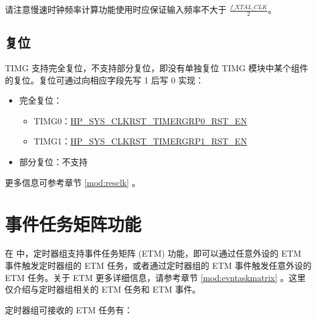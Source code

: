 \documentclass[main\_\_CN.tex]{subfiles}
\begin{document}
请注意慢速时钟频率计算功能使用时应保证输入频率不大于 $\frac{f\_XTAL\_CLK}{2}$。


\subsection{复位}


TIMG 支持完全复位，不支持部分复位，即没有单独复位 TIMG 模块中某个组件的复位。复位可通过向相应字段先写 1 后写 0 实现：

\begin{itemize}
    \item 完全复位：
        \begin{itemize}
            \item TIMG0：\hyperref[fielddesc:HPSYSCLKRSTTIMERGRP0RSTEN]{HP\_SYS\_CLKRST\_TIMERGRP0\_RST\_EN}
            \item TIMG1：\hyperref[fielddesc:HPSYSCLKRSTTIMERGRP1RSTEN]{HP\_SYS\_CLKRST\_TIMERGRP1\_RST\_EN}
        \end{itemize}
    \item 部分复位：不支持
\end{itemize}

更多信息可参考章节 \ref{mod:resclk} \textit{}。



\section{事件任务矩阵功能}
\label{sec:timg-etm-func}

在 \chipname{} 中，定时器组支持事件任务矩阵 (ETM) 功能，即可以通过任意外设的 ETM 事件触发定时器组的 ETM 任务，或者通过定时器组的 ETM 事件触发任意外设的 ETM 任务。关于 ETM 更多详细信息，请参考章节 \ref{mod:evntaskmatrix} \textit{}。这里仅介绍与定时器组相关的 ETM 任务和 ETM 事件。

定时器组可接收的 ETM 任务有：
\end{document}
